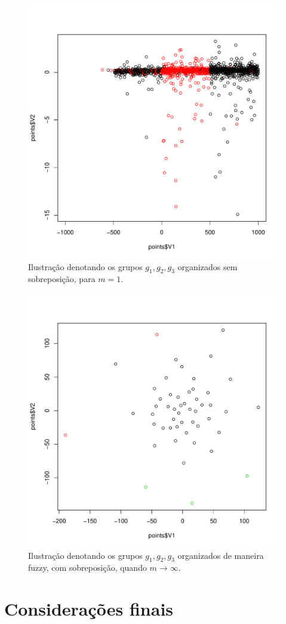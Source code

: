 \begin{figure}[!htp] \centering 
  \centering
  \includegraphics[width=0.8\columnwidth]{assets/pdcl/20newsgrou2fcmsoft-fdcleuclidian.pdf} 
  \caption{Ilustração denotando os
  grupos $g_1,g_2,g_3$ organizados sem sobreposição, para $m = 1$.} 
  \label{fig:newsgroup}
\end{figure}
\begin{figure}[!htp] \centering 
    \includegraphics[width=0.8\columnwidth]{assets/pdcl/pfcmmixed-pdcleuclidian.pdf} 
    \caption{Ilustração denotando os
     grupos $g_1,g_2,g_3$ organizados de maneira fuzzy, com sobreposição, quando 
     $m \rightarrow \infty$.}
     \label{fig:mixed_opinosis} 
\end{figure}

\section{Considerações finais}
